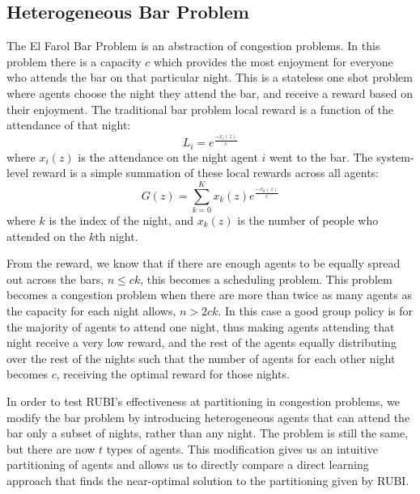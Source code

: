 \documentclass[letterpaper]{article}
\begin{document}
\subsection{Heterogeneous Bar Problem}

The El Farol Bar Problem \cite{BarProblem} is an abstraction of congestion problems. In this problem there is a capacity $c$ which provides the most enjoyment for everyone who attends the bar on that particular night. This is a stateless one shot problem where agents choose the night they attend the bar, and receive a reward based on their enjoyment. The traditional bar problem local reward is a function of the attendance of that night:
%
\begin{equation} \label{eq:BarProblem-Local}
L_i = e^{\frac{-x_i(z)}{c}}
\end{equation}
%
where $x_i(z)$ is the attendance on the night agent $i$ went to the bar. The system-level reward is a simple summation of these local rewards across all agents:
%
\begin{equation} \label{eq:BarProblem-Global}
G(z) = \sum_{k=0}^K x_k(z) e^{\frac{-x_k(z)}{c}}
\end{equation}
%
where $k$ is the index of the night, and $x_k(z)$ is the number of people who attended on the $k$th night. 

From the reward, we know that if there are enough agents to be equally spread out across the bars, $n \leq ck$, this becomes a scheduling problem. This problem becomes a congestion problem when there are more than twice as many agents as the capacity for each night allows, $n > 2ck$. In this case a good group policy is for the majority of agents to attend one night, thus making agents attending that night receive a very low reward, and the rest of the agents equally distributing over the rest of the nights such that the number of agents for each other night becomes $c$, receiving the optimal reward for those nights. 


In order to test RUBI's effectiveness at partitioning in congestion problems, we modify the bar problem by introducing heterogeneous agents that can attend the bar only a subset of nights, rather than any night. The problem is still the same, but there are now $t$ types of agents. This modification gives us an intuitive partitioning of agents and allows us to directly compare a direct learning approach that finds the near-optimal solution to the partitioning given by RUBI.
\end{document}
